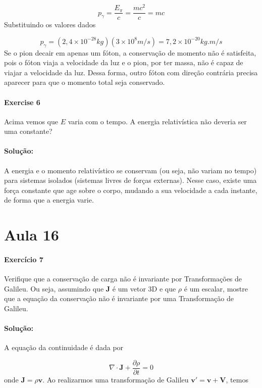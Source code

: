 \documentclass[10pt,a4paper]{article}
\begin{document}
\begin{equation}
p_{\gamma} = \frac{E_{\pi}}{c} = \frac{mc^2}{c} = mc
\end{equation}
Substituindo os valores dados 

\begin{equation}
p_{\gamma} = (2,4\times 10^{-28}\si{kg})(3\times 10^8 \unit{m/s}) = 7,2 \times 10^{-20}\si{kg.m/s}
\end{equation}
Se o pion decair em apenas um fóton, a conservação de momento não é satisfeita, pois o fóton viaja a velocidade da luz e o pion, por ter massa, não é capaz de viajar a velocidade da luz. Dessa forma, outro fóton com direção contrária precisa aparecer para que o momento total seja conservado.

\paragraph{Exercise 6} Acima vemos que $E$ varia com o tempo. A energia relativística não deveria ser uma constante?

\paragraph{Solução:} A energia e o momento relativístico se conservam (ou seja, não variam no tempo) para sistemas isolados (sistemas livres de forças externas). Nesse caso, existe uma força constante que age sobre o corpo, mudando a sua velocidade a cada instante, de forma que a energia varie.

\section*{Aula 16}
\paragraph{Exercício 7} Verifique que a conservação de carga não é invariante por Transformações de Galileu. Ou seja, assumindo que \textbf{J} é um vetor 3D e que $\rho$ é um escalar, mostre que a equação da conservação não é invariante por uma Transformação de Galileu.

\paragraph{Solução:} A equação da continuidade é dada por

\begin{equation*}
	\nabla\cdot\mathbf{J} + \dfrac{\partial \rho}{\partial t} = 0
\end{equation*}
onde $ \mathbf{J} = \rho\mathbf{v} $. Ao realizarmos uma transformação de Galileu $ \mathbf{v'} = \mathbf{v} + \mathbf{V} $, temos
\end{document}
